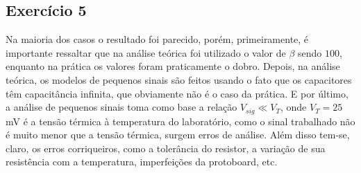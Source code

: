 \documentclass[journal, a4paper]{IEEEtran}
\begin{document}
          \subsection{Exercício 5}
    			Na maioria dos casos o resultado foi parecido, porém, primeiramente, é importante ressaltar que na análise teórica foi utilizado o valor de $\beta$ sendo $100$, enquanto na prática os valores foram praticamente o dobro. Depois, na análise teórica, os modelos de pequenos sinais são feitos usando o fato que os capacitores têm capacitância infinita, que obviamente não é o caso da prática. E por último, a análise de pequenos sinais toma como base a relação $V_{sig} \ll V_T$, onde $V_T = 25$mV é a tensão térmica à temperatura do laboratório, como o sinal trabalhado não é muito menor que a tensão térmica, surgem erros de análise. Além disso tem-se, claro, os erros corriqueiros, como a tolerância do resistor, a variação de sua resistência com a temperatura, imperfeições da protoboard, etc.
			
\end{document}
